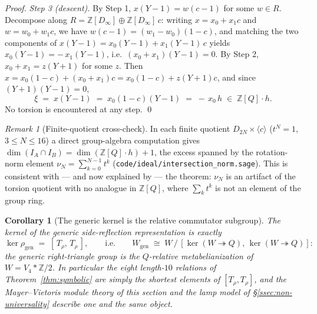\documentclass[11pt,a4paper]{article}
\newtheorem{corollary}[theorem]{Corollary}
\theoremstyle{remark}
\newtheorem{remark}[theorem]{Remark}
\theoremstyle{plain}
\begin{document}
\begin{proof}
\emph{Step 3 (descent).}  By Step 1, $x(Y-1) = w(c-1)$ for some
$w \in R$.  Decompose along
$R = \mathbb{Z}[D_\infty] \oplus \mathbb{Z}[D_\infty]\,c$:
writing $x = x_0 + x_1 c$ and $w = w_0 + w_1 c$, we have
$w(c-1) = (w_1 - w_0)(1 - c)$, and matching the two components of
$x(Y-1) = x_0(Y-1) + x_1(Y-1)\,c$ yields
$x_0(Y-1) = -\,x_1(Y-1)$, i.e.\ $(x_0 + x_1)(Y-1) = 0$.  By Step 2,
$x_0 + x_1 = z(Y+1)$ for some $z$.  Then
$x = x_0(1-c) + (x_0 + x_1)c = x_0(1-c) + z(Y+1)c$, and since
$(Y+1)(Y-1) = 0$,
\[
\xi \;=\; x(Y-1) \;=\; x_0(1-c)(Y-1) \;=\; -\,x_0\, h
\;\in\; \mathbb{Z}[Q]\cdot h .
\]
No torsion is encountered at any step.
\qed
\end{proof}

\begin{remark}[Finite-quotient cross-check]
\label{rem:norm-artifact}
In each finite quotient $D_{2N} \times \langle c \rangle$
($t^N = 1$, $3 \le N \le 16$) a direct group-algebra computation gives
$\dim(I_A \cap I_B) = \dim(\mathbb{Z}[Q]\cdot h) + 1$, the excess
spanned by the rotation-norm element $\nu_N = \sum_{k=0}^{N-1} t^k$
(\texttt{code/ideal/intersection\_norm.sage}).  This is consistent
with --- and now explained by --- the theorem: $\nu_N$ is an artifact
of the torsion quotient with no analogue in $\mathbb{Z}[Q]$, where
$\sum_k t^k$ is not an element of the group ring.
\end{remark}

\begin{corollary}[The generic kernel is the relative commutator
subgroup]
\label{cor:generic-kernel}
The kernel of the generic side-reflection representation is exactly
\[
\ker \rho_{\mathrm{gen}} \;=\; [\,T_\rho,\, T_\rho\,],
\qquad\text{i.e.}\qquad
W_{\mathrm{gen}} \;\cong\; W \,/\, [\ker(W \twoheadrightarrow
Q),\, \ker(W \twoheadrightarrow Q)] :
\]
the generic right-triangle group is the $Q$-relative metabelianization
of $W = V_4 * \mathbb{Z}/2$.  In particular the eight length-$10$
relations of Theorem~\ref{thm:symbolic} are simply the shortest
elements of $[T_\rho, T_\rho]$, and the Mayer--Vietoris module theory
of this section and the lamp model of \S\ref{ssec:non-universality}
describe one and the same object.
\end{corollary}
\end{document}
